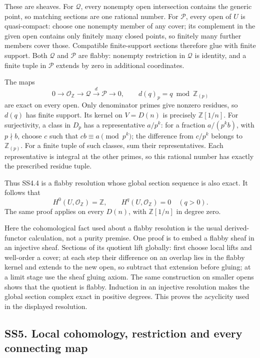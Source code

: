 These are sheaves. For \(\mathcal Q\), every nonempty open intersection
contains the generic point, so matching sections are one rational
number. For \(\mathcal P\), every open of \(U\) is quasi-compact: choose
one nonempty member of any cover; its complement in the given open
contains only finitely many closed points, so finitely many further
members cover those. Compatible finite-support sections therefore glue
with finite support. Both \(\mathcal Q\) and \(\mathcal P\) are flabby:
nonempty restriction in \(\mathcal Q\) is identity, and a finite tuple
in \(\mathcal P\) extends by zero in additional coordinates.

The maps \[
 0\longrightarrow\mathcal O_{\mathbb Z}
 \longrightarrow\mathcal Q
 \xrightarrow d\mathcal P\longrightarrow0,\qquad
 d(q)_p=q\bmod\mathbb Z_{(p)}
\tag{SS4.4}
\] are exact on every open. Only denominator primes give nonzero
residues, so \(d(q)\) has finite support. Its kernel on \(V=D(n)\) is
precisely \(\mathbb Z[1/n]\). For surjectivity, a class in \(D_p\) has a
representative \(a/p^k\): for a fraction \(a/(p^kb)\), with
\(p\nmid b\), choose \(c\) such that \(cb\equiv a\pmod{p^k}\); the
difference from \(c/p^k\) belongs to \(\mathbb Z_{(p)}\). For a finite
tuple of such classes, sum their representatives. Each representative is
integral at the other primes, so this rational number has exactly the
prescribed residue tuple.

Thus SS4.4 is a flabby resolution whose global section sequence is also
exact. It follows that \[
 H^0(U,\mathcal O_{\mathbb Z})=\mathbb Z,\qquad
 H^q(U,\mathcal O_{\mathbb Z})=0\quad(q>0).
\tag{SS4.5}
\] The same proof applies on every \(D(n)\), with \(\mathbb Z[1/n]\) in
degree zero.

Here the cohomological fact used about a flabby resolution is the usual
derived-functor calculation, not a purity premise. One proof is to embed
a flabby sheaf in an injective sheaf. Sections of its quotient lift
globally: first choose local lifts and well-order a cover; at each step
their difference on an overlap lies in the flabby kernel and extends to
the new open, so subtract that extension before gluing; at a limit stage
use the sheaf gluing axiom. The same construction on smaller opens shows
that the quotient is flabby. Induction in an injective resolution makes
the global section complex exact in positive degrees. This proves the
acyclicity used in the displayed resolution.

\subsection{SS5. Local cohomology, restriction and every connecting
map}\label{ss5.-local-cohomology-restriction-and-every-connecting-map}

